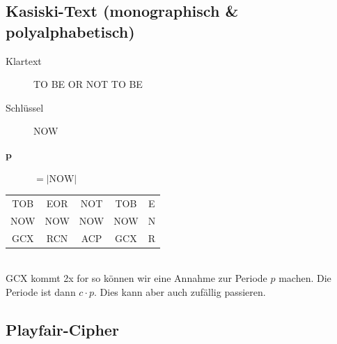 \documentclass[10pt]{article}
\newcommand{\T}[1]{\text{#1}} %
\newcommand{\Abs}[1]{\left| #1 \right|} %
\begin{document}
\subsection{Kasiski-Text (monographisch \& polyalphabetisch)}
\begin{description}
	\item[Klartext] TO BE OR NOT TO BE
	\item[Schlüssel] NOW
	\item[$\mathbf{p}$] $=\Abs{\T{NOW}}$
\end{description}
\begin{tabular}{c|c|c|c|c}
 TOB&EOR&NOT&TOB&E\\
 NOW&NOW&NOW&NOW&N\\
 GCX&RCN&ACP&GCX&R
\end{tabular}\\
GCX kommt 2x for so können wir eine Annahme zur Periode $p$ machen. Die Periode ist dann $c\cdot p$. Dies kann aber auch zufällig passieren.
\subsection{Playfair-Cipher}
\end{document}
